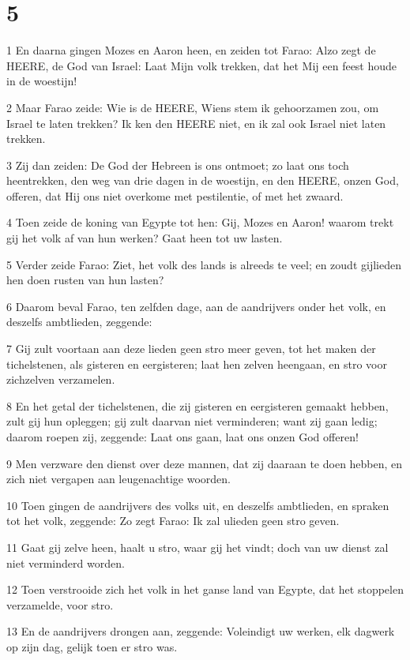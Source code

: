 \chapter{5}

\par 1 En daarna gingen Mozes en Aaron heen, en zeiden tot Farao: Alzo zegt de HEERE, de God van Israel: Laat Mijn volk trekken, dat het Mij een feest houde in de woestijn!
\par 2 Maar Farao zeide: Wie is de HEERE, Wiens stem ik gehoorzamen zou, om Israel te laten trekken? Ik ken den HEERE niet, en ik zal ook Israel niet laten trekken.
\par 3 Zij dan zeiden: De God der Hebreen is ons ontmoet; zo laat ons toch heentrekken, den weg van drie dagen in de woestijn, en den HEERE, onzen God, offeren, dat Hij ons niet overkome met pestilentie, of met het zwaard.
\par 4 Toen zeide de koning van Egypte tot hen: Gij, Mozes en Aaron! waarom trekt gij het volk af van hun werken? Gaat heen tot uw lasten.
\par 5 Verder zeide Farao: Ziet, het volk des lands is alreeds te veel; en zoudt gijlieden hen doen rusten van hun lasten?
\par 6 Daarom beval Farao, ten zelfden dage, aan de aandrijvers onder het volk, en deszelfs ambtlieden, zeggende:
\par 7 Gij zult voortaan aan deze lieden geen stro meer geven, tot het maken der tichelstenen, als gisteren en eergisteren; laat hen zelven heengaan, en stro voor zichzelven verzamelen.
\par 8 En het getal der tichelstenen, die zij gisteren en eergisteren gemaakt hebben, zult gij hun opleggen; gij zult daarvan niet verminderen; want zij gaan ledig; daarom roepen zij, zeggende: Laat ons gaan, laat ons onzen God offeren!
\par 9 Men verzware den dienst over deze mannen, dat zij daaraan te doen hebben, en zich niet vergapen aan leugenachtige woorden.
\par 10 Toen gingen de aandrijvers des volks uit, en deszelfs ambtlieden, en spraken tot het volk, zeggende: Zo zegt Farao: Ik zal ulieden geen stro geven.
\par 11 Gaat gij zelve heen, haalt u stro, waar gij het vindt; doch van uw dienst zal niet verminderd worden.
\par 12 Toen verstrooide zich het volk in het ganse land van Egypte, dat het stoppelen verzamelde, voor stro.
\par 13 En de aandrijvers drongen aan, zeggende: Voleindigt uw werken, elk dagwerk op zijn dag, gelijk toen er stro was.
